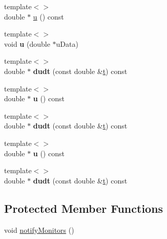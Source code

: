 \begin{DoxyCompactItemize}
{\footnotesize template$<$$>$ }\\double $\ast$ \hyperlink{a00818_a9cc60054f9342b4a84b29937dc45a6d8}{u} () const
\item 
\mbox{\label{a00818_a2a3ffc947a9658d7e7173591460d9424}} 
{\footnotesize template$<$$>$ }\\void {\bfseries u} (double $\ast$u\+Data)
\item 
\mbox{\label{a00818_afa1168dde00e19cee4a7d6d28b4bf9eb}} 
{\footnotesize template$<$$>$ }\\double $\ast$ {\bfseries dudt} (const double \&\hyperlink{a00818_a5d8acc4d5bdd8942de10d34c55680349}{t}) const
\item 
\mbox{\label{a00818_ac2313bde7f5d55daee4097232e9ae5ea}} 
{\footnotesize template$<$$>$ }\\double $\ast$ {\bfseries u} () const
\item 
\mbox{\label{a00818_a93837c9543786144b6517a295ed1fec8}} 
{\footnotesize template$<$$>$ }\\double $\ast$ {\bfseries dudt} (const double \&\hyperlink{a00818_a5d8acc4d5bdd8942de10d34c55680349}{t}) const
\item 
\mbox{\label{a00818_ac2313bde7f5d55daee4097232e9ae5ea}} 
{\footnotesize template$<$$>$ }\\double $\ast$ {\bfseries u} () const
\item 
\mbox{\label{a00818_a93837c9543786144b6517a295ed1fec8}} 
{\footnotesize template$<$$>$ }\\double $\ast$ {\bfseries dudt} (const double \&\hyperlink{a00818_a5d8acc4d5bdd8942de10d34c55680349}{t}) const
\end{DoxyCompactItemize}
\subsection*{Protected Member Functions}
\begin{DoxyCompactItemize}
\item 
void \hyperlink{a00818_ad271749a2a4f73c11e82ae28141d3b65}{notify\+Monitors} ()
\end{DoxyCompactItemize}
